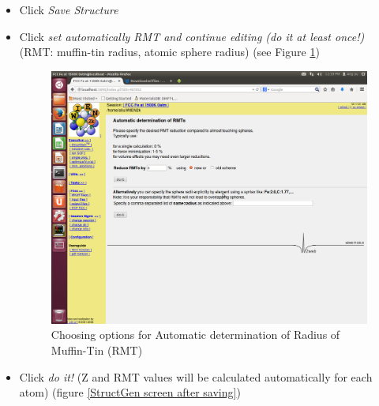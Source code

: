 \documentclass[12 pt]{article}
\begin{document}
\begin{itemize}[leftmargin=0.2in]
\begin{itemize}
  \cleardoublepage

      \item Click \emph{Save Structure}

      \item Click \emph{set automatically RMT and continue editing (do it at least once!)} (RMT: muffin-tin radius, 
atomic sphere radius) (see Figure \ref{Choosing options for Automatic determination of Radius of Muffin-Tin (RMT)})

  \begin{figure}[ht]
    \centering
    \captionsetup{justification=centering}
    \caption{Choosing options for Automatic determination of Radius of Muffin-Tin (RMT)}
    \label{Choosing options for Automatic determination of Radius of Muffin-Tin (RMT)}
    \vspace{2ex}
    \includegraphics[scale=0.35, trim=2.3cm 0cm 0cm 4.3cm, clip=true]{StructGen3}
  \end{figure}

  \cleardoublepage

      \item Click \emph{do it!} (Z and RMT values will be calculated automatically for each atom) (figure 
\ref{StructGen screen after saving})


\end{itemize}
\end{itemize}
\end{document}
